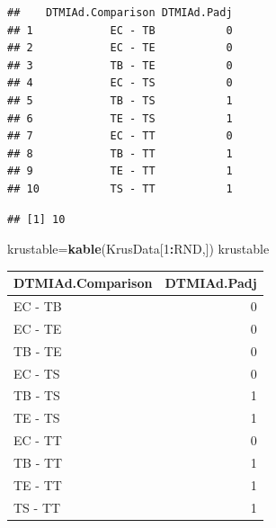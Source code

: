 \documentclass[]{article}
\newenvironment{Shaded}{\begin{snugshade}}{\end{snugshade}}
\newcommand{\DecValTok}[1]{\textcolor[rgb]{0.00,0.00,0.81}{#1}}
\newcommand{\KeywordTok}[1]{\textcolor[rgb]{0.13,0.29,0.53}{\textbf{#1}}}
\newcommand{\NormalTok}[1]{#1}
\newcommand{\OperatorTok}[1]{\textcolor[rgb]{0.81,0.36,0.00}{\textbf{#1}}}
\newcommand{\StringTok}[1]{\textcolor[rgb]{0.31,0.60,0.02}{#1}}
\begin{document}
\begin{verbatim}
##    DTMIAd.Comparison DTMIAd.Padj
## 1            EC - TB           0
## 2            EC - TE           0
## 3            TB - TE           0
## 4            EC - TS           0
## 5            TB - TS           1
## 6            TE - TS           1
## 7            EC - TT           0
## 8            TB - TT           1
## 9            TE - TT           1
## 10           TS - TT           1
\end{verbatim}

\begin{Shaded}
\end{Shaded}

\begin{verbatim}
## [1] 10
\end{verbatim}

\begin{Shaded}
\begin{Highlighting}[]
\NormalTok{krustable=}\KeywordTok{kable}\NormalTok{(KrusData[}\DecValTok{1}\OperatorTok{:}\NormalTok{RND,])}
\NormalTok{krustable}
\end{Highlighting}
\end{Shaded}

\begin{longtable}[]{@{}lr@{}}
\toprule
DTMIAd.Comparison & DTMIAd.Padj\tabularnewline
\midrule
\endhead
EC - TB & 0\tabularnewline
EC - TE & 0\tabularnewline
TB - TE & 0\tabularnewline
EC - TS & 0\tabularnewline
TB - TS & 1\tabularnewline
TE - TS & 1\tabularnewline
EC - TT & 0\tabularnewline
TB - TT & 1\tabularnewline
TE - TT & 1\tabularnewline
TS - TT & 1\tabularnewline
\bottomrule
\end{longtable}

\begin{Shaded}
\end{Shaded}
\end{document}
